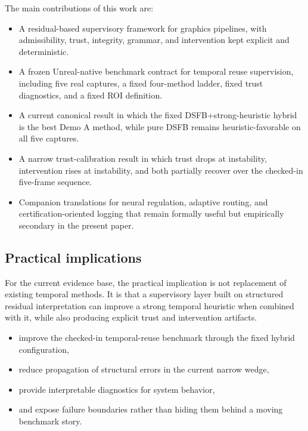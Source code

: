 \documentclass[11pt,letterpaper]{article}
\theoremstyle{gcresult}
\theoremstyle{definition}
\begin{document}
The main contributions of this work are:

\begin{itemize}[leftmargin=1.5em]
    \item A residual-based supervisory framework for graphics pipelines, with admissibility, trust, integrity, grammar, and intervention kept explicit and deterministic.
    \item A frozen Unreal-native benchmark contract for temporal reuse supervision, including five real captures, a fixed four-method ladder, fixed trust diagnostics, and a fixed ROI definition.
    \item A current canonical result in which the fixed DSFB+strong-heuristic hybrid is the best Demo A method, while pure DSFB remains heuristic-favorable on all five captures.
    \item A narrow trust-calibration result in which trust drops at instability, intervention rises at instability, and both partially recover over the checked-in five-frame sequence.
    \item Companion translations for neural regulation, adaptive routing, and certification-oriented logging that remain formally useful but empirically secondary in the present paper.
\end{itemize}


\subsection{Practical implications}

For the current evidence base, the practical implication is not replacement of existing temporal methods. It is that a supervisory layer built on structured residual interpretation can improve a strong temporal heuristic when combined with it, while also producing explicit trust and intervention artifacts.

\begin{itemize}[leftmargin=1.5em]
    \item improve the checked-in temporal-reuse benchmark through the fixed hybrid configuration,
    \item reduce propagation of structural errors in the current narrow wedge,
    \item provide interpretable diagnostics for system behavior,
    \item and expose failure boundaries rather than hiding them behind a moving benchmark story.
\end{itemize}
\end{document}
